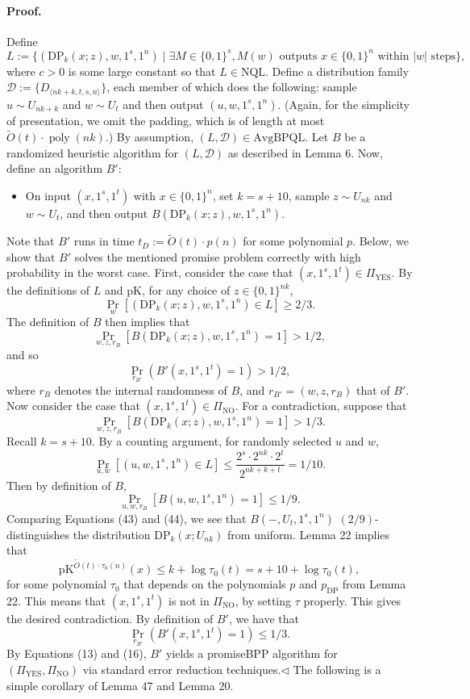 \paragraph{Proof.} Define
\[L:=\{(\mathrm{DP}_k(x;z),w,1^s,1^n)\mid\exists M\in\{0,1\}^s,M(w)\text{ outputs }x\in\{0,1\}^n\text{ within }|w|\text{ steps}\},\]
where $c>0$ is some large constant so that $L\in\mathrm{NQL}$. Define a distribution family $\mathcal D:=\{D_{\langle nk+k,t,s,n\rangle}\}$, each member of which does the following: sample $u\sim U_{nk+k}$ and $w\sim U_t$ and then output $(u,w,1^s,1^n)$. (Again, for the simplicity of presentation, we omit the padding, which is of length at most $\widetilde O(t)\cdot\operatorname{poly}(nk)$.) By assumption, $(L,\mathcal D)\in\mathrm{AvgBPQL}$. Let $B$ be a randomized heuristic algorithm for $(L,\mathcal D)$ as described in Lemma 6. Now, define an algorithm $B'$:
\begin{itemize}
\item On input $(x,1^s,1^t)$ with $x\in\{0,1\}^n$, set $k=s+10$, sample $z\sim U_{nk}$ and $w\sim U_t$, and then output $B(\mathrm{DP}_k(x;z),w,1^s,1^n)$.
\end{itemize}
Note that $B'$ runs in time $t_D:=\widetilde O(t)\cdot p(n)$ for some polynomial $p$. Below, we show that $B'$ solves the mentioned promise problem correctly with high probability in the worst case.
First, consider the case that $(x,1^s,1^t)\in\Pi_{\mathrm{YES}}$. By the definitions of $L$ and pK, for any choice of $z\in\{0,1\}^{nk}$,
\[\Pr_w[(\mathrm{DP}_k(x;z),w,1^s,1^n)\in L]\geq2/3.\]
The definition of $B$ then implies that
\[\Pr_{w,z,r_B}[B(\mathrm{DP}_k(x;z),w,1^s,1^n)=1]>1/2,\]
and so
\[\Pr_{r_{B'}}(B'(x,1^s,1^t)=1)>1/2,\tag{42}\]
where $r_B$ denotes the internal randomness of $B$, and $r_{B'}=(w,z,r_B)$ that of $B'$.
Now consider the case that $(x,1^s,1^t)\in\Pi_{\mathrm{NO}}$. For a contradiction, suppose that
\[\Pr_{w,z,r_B}[B(\mathrm{DP}_k(x;z),w,1^s,1^n)=1]>1/3.\tag{43}\]
Recall $k=s+10$. By a counting argument, for randomly selected $u$ and $w$,
\[\Pr_{u,w}[(u,w,1^s,1^n)\in L]\leq\frac{2^s\cdot2^{nk}\cdot2^t}{2^{nk+k+t}}=1/10.\]
Then by definition of $B$,
\[\Pr_{u,w,r_B}[B(u,w,1^s,1^n)=1]\leq1/9.\tag{44}\]
Comparing Equations (43) and (44), we see that $B(-,U_t,1^s,1^n)$ $(2/9)$-distinguishes the distribution $\mathrm{DP}_k(x;U_{nk})$ from uniform. Lemma 22 implies that
\[\mathrm{pK}^{\widetilde O(t)\cdot\tau_0(n)}(x)\leq k+\log\tau_0(t)=s+10+\log\tau_0(t),\]
for some polynomial $\tau_0$ that depends on the polynomials $p$ and $p_{\mathrm{DP}}$ from Lemma 22. This means that $(x,1^s,1^t)$ is not in $\Pi_{\mathrm{NO}}$, by setting $\tau$ properly. This gives the desired contradiction. By definition of $B'$, we have that
\[\Pr_{r_{B'}}(B'(x,1^s,1^t)=1)\leq1/3.\tag{45}\]
By Equations (13) and (16), $B'$ yields a promiseBPP algorithm for $(\Pi_{\mathrm{YES}},\Pi_{\mathrm{NO}})$ via standard error reduction techniques.\hfill$\triangleleft$
The following is a simple corollary of Lemma 47 and Lemma 20.
